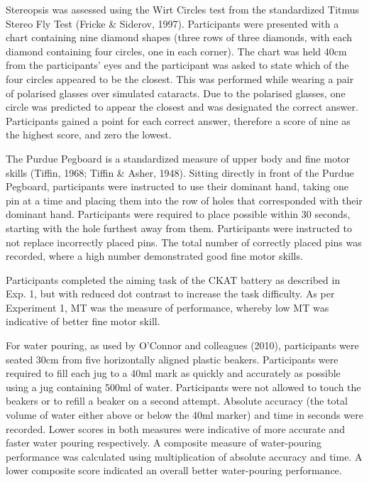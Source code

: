 \documentclass[
  english,
  man,floatsintext]{apa6}
\begin{document}
Stereopsis was assessed using the Wirt Circles test from the standardized Titmus Stereo Fly Test (Fricke \& Siderov, 1997).
Participants were presented with a chart containing nine diamond shapes (three rows of three diamonds, with each diamond containing four circles, one in each corner).
The chart was held 40cm from the participants' eyes and the participant was asked to state which of the four circles appeared to be the closest.
This was performed while wearing a pair of polarised glasses over simulated cataracts.
Due to the polarised glasses, one circle was predicted to appear the closest and was designated the correct answer.
Participants gained a point for each correct answer, therefore a score of nine as the highest score, and zero the lowest.

The Purdue Pegboard is a standardized measure of upper body and fine motor skills (Tiffin, 1968; Tiffin \& Asher, 1948).
Sitting directly in front of the Purdue Pegboard, participants were instructed to use their dominant hand, taking one pin at a time and placing them into the row of holes that corresponded with their dominant hand.
Participants were required to place possible within 30 seconds, starting with the hole furthest away from them.
Participants were instructed to not replace incorrectly placed pins.
The total number of correctly placed pins was recorded, where a high number demonstrated good fine motor skills.

Participants completed the aiming task of the CKAT battery as described in Exp. 1, but with reduced dot contrast to increase the task difficulty.
As per Experiment 1, MT was the measure of performance, whereby low MT was indicative of better fine motor skill.

For water pouring, as used by O'Connor and colleagues (2010), participants were seated 30cm from five horizontally aligned plastic beakers.
Participants were required to fill each jug to a 40ml mark as quickly and accurately as possible using a jug containing 500ml of water.
Participants were not allowed to touch the beakers or to refill a beaker on a second attempt.
Absolute accuracy (the total volume of water either above or below the 40ml marker) and time in seconds were recorded.
Lower scores in both measures were indicative of more accurate and faster water pouring respectively.
A composite measure of water-pouring performance was calculated using multiplication of absolute accuracy and time.
A lower composite score indicated an overall better water-pouring performance.
\end{document}

